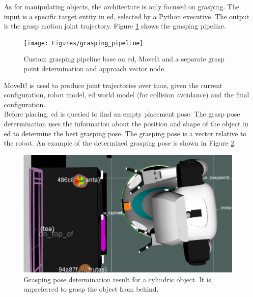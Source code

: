 As for manipulating objects, the architecture is only focused on grasping. The input is a specific target entity in \acrshort{ed}, selected by a Python executive. The output is the grasp motion joint trajectory.
Figure \ref{fig:grasping_pipeline} shows the grasping pipeline.
\begin{figure}[h]
    \centering
	\texttt{[image: Figures/grasping\_pipeline]}
	\caption{Custom grasping pipeline base on \acrshort{ed}, MoveIt and a separate grasp point determination and approach vector node.}
	\label{fig:grasping_pipeline}
\end{figure}
MoveIt! is used to produce joint trajectories over time, given the current configuration, robot model, \acrshort{ed} world model (for collision avoidance) and the final configuration.
\\
Before placing, \acrshort{ed} is queried to find an empty placement pose.
The grasp pose determination uses the information about the position and shape of the object in \acrshort{ed} to determine the best grasping pose.
The grasping pose is a vector relative to the robot.
An example of the determined grasping pose is shown in Figure \ref{fig:grasping_pose_determination}.
\begin{figure}[H]
   \centering
   \includegraphics[width = 0.8\linewidth]{Figures/grasp_point_determination}
	\caption{Grasping pose determination result for a cylindric object. It is unpreferred to grasp the object from behind.}
	\label{fig:grasping_pose_determination}
\end{figure}
